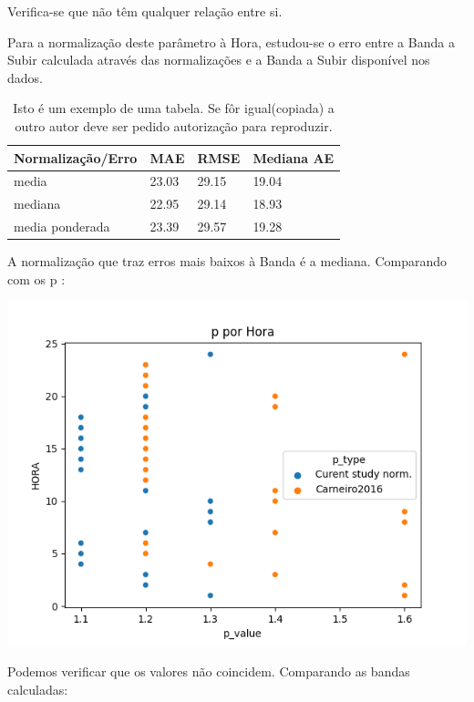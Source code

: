 Verifica-se que não têm qualquer relação entre si.

Para a normalização deste parâmetro à Hora, estudou-se o erro entre a Banda a Subir calculada através das normalizações e a Banda a Subir disponível nos dados. 

\begin{table}[H]
\centering
\caption{Isto é um exemplo de uma tabela. Se fôr igual(copiada) a outro autor deve ser pedido autorização para reproduzir.}
\begin{tabular}{p{5cm}p{3.5cm}p{2cm}p{2cm}}
\toprule %
\textbf{Normalização/Erro} & \textbf{MAE} & \textbf{RMSE} & \textbf{Mediana AE} \\ \hline
\multirow{1}{*}{media}   & 23.03 & 29.15 & 19.04            \\ \hline
\multirow{1}{*}{mediana}   & 22.95 & 29.14 & 18.93            \\ \hline
\multirow{1}{*}{media ponderada}   & 23.39 & 29.57 & 19.28            \\ \hline
\end{tabular}
\end{table}

A normalização que traz erros mais baixos à Banda é a mediana.
Comparando com os p \cite{Carneiro2016}: 

\includegraphics{Imagens/p por Hora norm.png}

Podemos verificar que os valores não coincidem.
Comparando as bandas calculadas:

